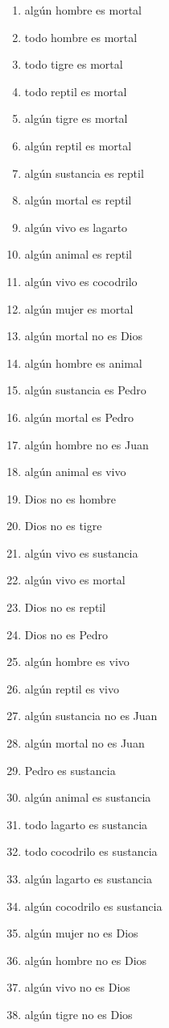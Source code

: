 ﻿\documentclass[12pt]{book}
\begin{document}
\begin{enumerate}
\item algún hombre es mortal
\item todo hombre es mortal
\item todo tigre es mortal
\item todo reptil es mortal
\item algún tigre es mortal
\item algún reptil es mortal
\item algún sustancia es reptil
\item algún mortal es reptil
\item algún vivo es lagarto
\item algún animal es reptil
\item algún vivo es cocodrilo
\item algún mujer es mortal
\item algún mortal no es Dios
\item algún hombre es animal
\item algún sustancia es Pedro
\item algún mortal es Pedro
\item algún hombre no es Juan
\item algún animal es vivo
\item Dios no es hombre
\item Dios no es tigre
\item algún vivo es sustancia
\item algún vivo es mortal
\item Dios no es reptil
\item Dios no es Pedro
\item algún hombre es vivo
\item algún reptil es vivo
\item algún sustancia no es Juan
\item algún mortal no es Juan
\item Pedro es sustancia
\item algún animal es sustancia
\item todo lagarto es sustancia
\item todo cocodrilo es sustancia
\item algún lagarto es sustancia
\item algún cocodrilo es sustancia
\item algún mujer no es Dios
\item algún hombre no es Dios
\item algún vivo no es Dios
\item algún tigre no es Dios

\end{enumerate}
\end{document}
